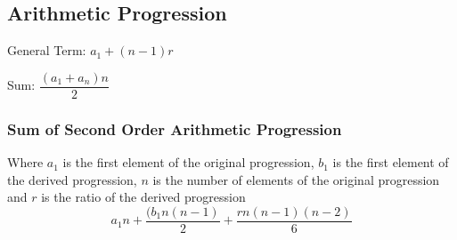 \subsection{Arithmetic Progression}

General Term: $ a_{1} + (n - 1) r $

Sum: $ \dfrac{(a_{1} + a_{n}) n}{2} $

\subsubsection{Sum of Second Order Arithmetic Progression}
Where $a_{1}$ is the first element of the original progression, $b_{1}$ is the first element of the derived progression, $n$ is the number of elements of the original progression and $r$ is the ratio of the derived progression
$$ a_{1} n + \dfrac{(b_{1} n (n - 1)}{2} + \dfrac{r n (n - 1) (n - 2)}{6} $$